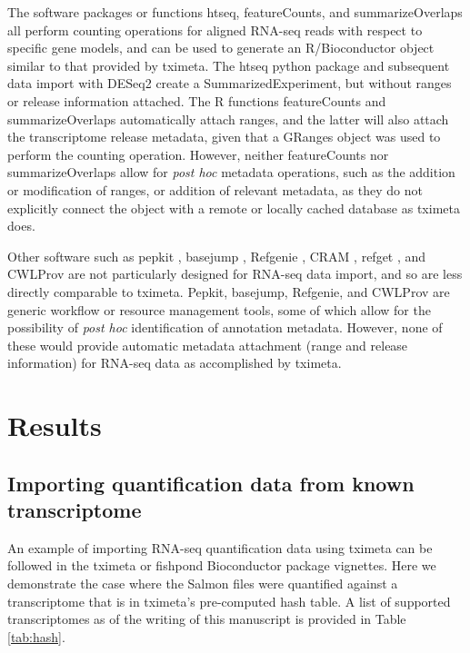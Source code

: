 \documentclass[10pt,letterpaper]{article}
\begin{document}
The software packages or functions htseq, featureCounts, and
summarizeOverlaps all 
perform counting operations for aligned RNA-seq reads with
respect to specific gene models, and can be used to generate an
R/Bioconductor object similar to that provided by tximeta.  The
htseq python package and subsequent data import with DESeq2 create a
SummarizedExperiment, but without ranges or release information
attached. The R functions featureCounts and summarizeOverlaps
automatically attach ranges, and the latter will also attach the
transcriptome release metadata, given that a GRanges object
was used to perform the counting operation. However, neither
featureCounts nor summarizeOverlaps allow for \textit{post hoc}
metadata operations, such as the addition or modification of ranges,
or addition of relevant metadata, as they do not explicitly connect
the object with a remote or locally cached database as tximeta
does.

Other software such as
pepkit \cite{pepkit}, basejump \cite{basejump},
Refgenie \cite{refgenie},
CRAM \cite{cram}, refget \cite{refget}, and
CWLProv \cite{Khan2018}
are not particularly designed for RNA-seq data import, and so are
less directly comparable to tximeta. Pepkit, basejump, Refgenie, and
CWLProv are generic workflow or resource management tools, some of
which allow for the possibility of \textit{post hoc} identification
of annotation metadata. However, none of these would provide
automatic metadata attachment (range and release information) for
RNA-seq data as accomplished by tximeta.

\section*{Results}

\subsection*{Importing quantification data from known transcriptome}

An example of importing RNA-seq quantification data using tximeta can
be followed in the tximeta or fishpond Bioconductor package
vignettes. Here we demonstrate the case where the Salmon files were
quantified against a transcriptome that is in tximeta's pre-computed
hash table. A list of supported transcriptomes as of the writing
of this manuscript is provided in Table \ref{tab:hash}. 
\end{document}
